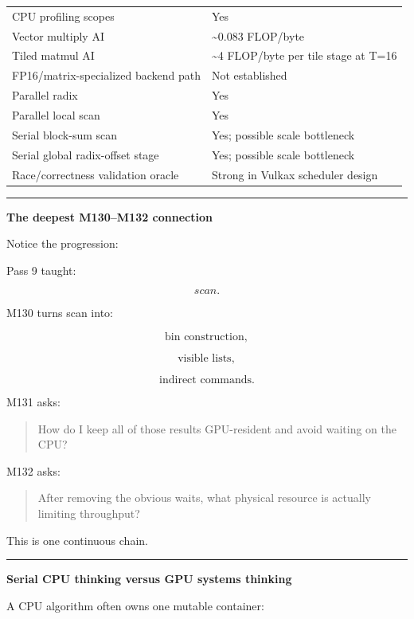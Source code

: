 {\begin{longtable}[]{@{}
  >{\raggedright\arraybackslash}p{}
  >{\raggedright\arraybackslash}p{}@{}}
CPU profiling scopes & Yes \\
Vector multiply AI & \textasciitilde0.083 FLOP/byte \\
Tiled matmul AI & \textasciitilde4 FLOP/byte per tile stage at T=16 \\
FP16/matrix-specialized backend path & Not established \\
Parallel radix & Yes \\
Parallel local scan & Yes \\
Serial block-sum scan & Yes; possible scale bottleneck \\
Serial global radix-offset stage & Yes; possible scale bottleneck \\
Race/correctness validation oracle & Strong in Vulkax scheduler design \\
\end{longtable}
}

\begin{center}\rule{0.5\linewidth}{0.5pt}\end{center}

\textbf{The deepest M130--M132 connection}

Notice the progression:

Pass 9 taught:

\[
scan.
\]

M130 turns scan into:

\[
\text{bin construction},
\]

\[
\text{visible lists},
\]

\[
\text{indirect commands}.
\]

M131 asks:

\begin{quote}
How do I keep all of those results GPU-resident and avoid waiting on the CPU?
\end{quote}

M132 asks:

\begin{quote}
After removing the obvious waits, what physical resource is actually limiting throughput?
\end{quote}

This is one continuous chain.

\begin{center}\rule{0.5\linewidth}{0.5pt}\end{center}

\textbf{Serial CPU thinking versus GPU systems thinking}

A CPU algorithm often owns one mutable container:

